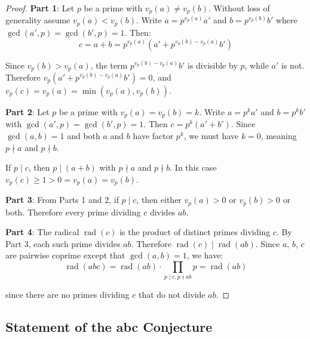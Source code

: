 \begin{proof}

\noindent \textbf{Part 1}: Let $p$ be a prime with $v_p(a) \neq v_p(b)$. Without loss of generality assume $v_p(a) < v_p(b)$. Write $a = p^{v_p(a)} a'$ and $b = p^{v_p(b)} b'$ where $\gcd(a', p) = \gcd(b', p) = 1$. Then:
\begin{equation}
c = a + b = p^{v_p(a)}(a' + p^{v_p(b) - v_p(a)} b')
\end{equation}

Since $v_p(b) > v_p(a)$, the term $p^{v_p(b) - v_p(a)} b'$ is divisible by $p$, while $a'$ is not. Therefore $v_p(a' + p^{v_p(b) - v_p(a)} b') = 0$, and $v_p(c) = v_p(a) = \min(v_p(a), v_p(b))$.

\noindent \textbf{Part 2}: Let $p$ be a prime with $v_p(a) = v_p(b) = k$. Write $a = p^k a'$ and $b = p^k b'$ with $\gcd(a', p) = \gcd(b', p) = 1$. Then $c = p^k(a' + b')$. Since $\gcd(a,b) = 1$ and both $a$ and $b$ have factor $p^k$, we must have $k = 0$, meaning $p \nmid a$ and $p \nmid b$.

If $p \mid c$, then $p \mid (a + b)$ with $p \nmid a$ and $p \nmid b$. In this case $v_p(c) \geq 1 > 0 = v_p(a) = v_p(b)$.

\noindent \textbf{Part 3}: From Parts 1 and 2, if $p \mid c$, then either $v_p(a) > 0$ or $v_p(b) > 0$ or both. Therefore every prime dividing $c$ divides $ab$.

\noindent \textbf{Part 4}: The radical $\operatorname{rad}(c)$ is the product of distinct primes dividing $c$. By Part 3, each such prime divides $ab$. Therefore $\operatorname{rad}(c) \mid \operatorname{rad}(ab)$. Since $a$, $b$, $c$ are pairwise coprime except that $\gcd(a,b) = 1$, we have:
\begin{equation}
\operatorname{rad}(abc) = \operatorname{rad}(ab) \cdot \prod_{p \mid c, p \nmid ab} p = \operatorname{rad}(ab)
\end{equation}

since there are no primes dividing $c$ that do not divide $ab$.

\end{proof}

\subsection{Statement of the abc Conjecture}
\label{subsec:abc-statement}

